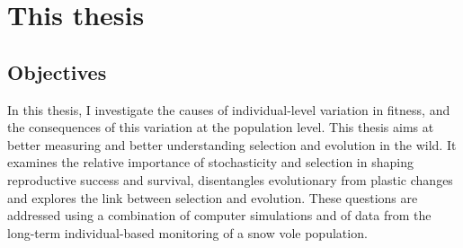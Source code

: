 \section{This thesis}
\subsection{Objectives}
In this thesis, I investigate the causes of individual-level variation in fitness, and the consequences of this variation at the population level. This thesis aims at better measuring and better understanding selection and evolution in the wild. It examines the relative importance of stochasticity and selection in shaping reproductive success and survival, disentangles evolutionary from plastic changes and explores the link between selection and evolution. These questions are addressed using a combination of computer simulations and of data from the long-term individual-based monitoring of a snow vole population.

